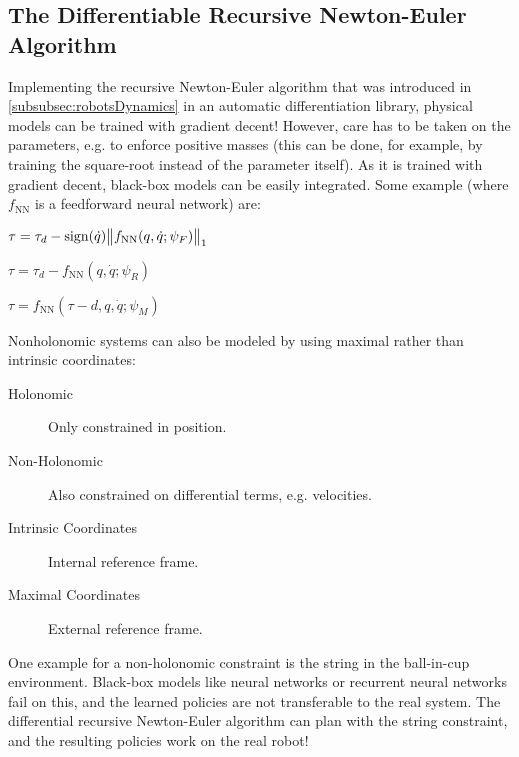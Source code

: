 		\subsection{The Differentiable Recursive Newton-Euler Algorithm}
			Implementing the recursive Newton-Euler algorithm that was introduced in \autoref{subsubsec:robotsDynamics} in an automatic differentiation library, physical models can be trained with gradient decent! However, care has to be taken on the parameters, e.g. to enforce positive masses (this can be done, for example, by training the square-root instead of the parameter itself). As it is trained with gradient decent, black-box models can be easily integrated. Some example (where \( f_\mathrm{NN} \) is a feedforward neural network) are:
			\begin{description}[leftmargin=3.5cm]
				\item[Friction]       \( \tau = \tau_d - \operatorname{sign}(\dot{q}) \big\lVert f_\mathrm{NN}(q, \dot{q}; \psi_F) \big\rVert_1 \)
				\item[Residual Error] \( \tau = \tau_d - f_\mathrm{NN}(q, \dot{q}; \psi_R) \)
				\item[Full NN]        \( \tau = f_\mathrm{NN}(\tau-d, q, \dot{q}; \psi_M) \)
			\end{description}

			Nonholonomic systems can also be modeled by using maximal rather than intrinsic coordinates:
			\begin{description}
				\item[Holonomic] Only constrained in position.
				\item[Non-Holonomic] Also constrained on differential terms, e.g. velocities.
				\item[Intrinsic Coordinates] Internal reference frame.
				\item[Maximal Coordinates] External reference frame.
			\end{description}
			One example for a non-holonomic constraint is the string in the ball-in-cup environment. Black-box models like neural networks or recurrent neural networks fail on this, and the learned policies are not transferable to the real system. The differential recursive Newton-Euler algorithm can plan with the string constraint, and the resulting policies work on the real robot!

